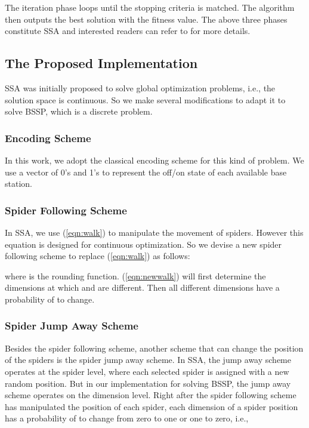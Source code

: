 \documentclass[conference]{IEEEtran}
\begin{document}
The iteration phase loops until the stopping criteria is matched. The algorithm then outputs the best solution with the fitness value. The above three phases constitute SSA and interested readers can refer to \cite{YuLi2013SocialSpiderAlgorithm} for more details.

\subsection{The Proposed Implementation}
SSA was initially proposed to solve global optimization problems, i.e., the solution space is continuous. So we make several modifications to adapt it to solve BSSP, which is a discrete problem.

\subsubsection{Encoding Scheme}
In this work, we adopt the classical encoding scheme for this kind of problem. We use a vector of 0's and 1's to represent the off/on state of each available base station.

\subsubsection{Spider Following Scheme}
In SSA, we use (\ref{eqn:walk}) to manipulate the movement of spiders. However this equation is designed for continuous optimization. So we devise a new spider following scheme to replace (\ref{eqn:walk}) as follows:

where  is the rounding function. (\ref{eqn:newwalk}) will first determine the dimensions at which  and  are different. Then all different dimensions have a probability of  to change.

\subsubsection{Spider Jump Away Scheme}
Besides the spider following scheme, another scheme that can change the position of the spiders is the spider jump away scheme. In SSA, the jump away scheme operates at the spider level, where each selected spider is assigned with a new random position. But in our implementation for solving BSSP, the jump away scheme operates on the dimension level. Right after the spider following scheme has manipulated the position of each spider, each dimension of a spider position has a probability of  to change from zero to one or one to zero, i.e.,
\end{document}
